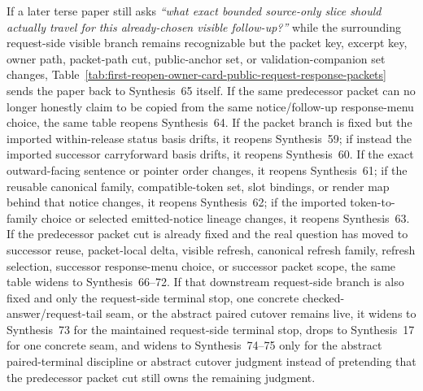 \documentclass[11pt]{article}
\begin{document}
If a later terse paper still asks \emph{``what exact bounded source-only slice should actually travel for this already-chosen visible follow-up?''} while the surrounding request-side visible branch remains recognizable but the packet key, excerpt key, owner path, packet-path cut, public-anchor set, or validation-companion set changes, Table~\ref{tab:first-reopen-owner-card-public-request-response-packets} sends the paper back to Synthesis~65 itself. If the same predecessor packet can no longer honestly claim to be copied from the same notice/follow-up response-menu choice, the same table reopens Synthesis~64. If the packet branch is fixed but the imported within-release status basis drifts, it reopens Synthesis~59; if instead the imported successor carryforward basis drifts, it reopens Synthesis~60. If the exact outward-facing sentence or pointer order changes, it reopens Synthesis~61; if the reusable canonical family, compatible-token set, slot bindings, or render map behind that notice changes, it reopens Synthesis~62; if the imported token-to-family choice or selected emitted-notice lineage changes, it reopens Synthesis~63. If the predecessor packet cut is already fixed and the real question has moved to successor reuse, packet-local delta, visible refresh, canonical refresh family, refresh selection, successor response-menu choice, or successor packet scope, the same table widens to Synthesis~66--72. If that downstream request-side branch is also fixed and only the request-side terminal stop, one concrete checked-answer/request-tail seam, or the abstract paired cutover remains live, it widens to Synthesis~73 for the maintained request-side terminal stop, drops to Synthesis~17 for one concrete seam, and widens to Synthesis~74--75 only for the abstract paired-terminal discipline or abstract cutover judgment instead of pretending that the predecessor packet cut still owns the remaining judgment.\cite{series:publicrequeststatusenvelopes,series:publicrequestcarryforward,series:publicrequestnotices,series:publicrequestnoticenormalforms,series:publicrequestnoticeselections,series:publicrequestresponsemenus,series:publicrequestresponsepacketcarryforward,series:publicrequestresponsepacketdeltas,series:publicrequestresponsepacketrefreshnotices,series:publicrequestresponsepacketrefreshnoticenormalforms,series:publicrequestresponsepacketrefreshnoticeselections,series:publicrequestresponsepacketrefreshresponsemenus,series:publicrequestresponsepacketrefreshresponsepackets,series:publicrequestresponsepacketrefreshresponsepacketclosureverdicts,series:pairedterminalcitationdiscipline,series:pairedterminalcutoverrules}
\end{document}
